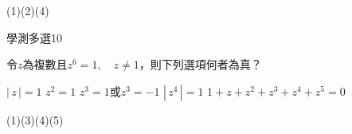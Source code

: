 \begin{QUESTIONS}
\begin{QUESTION}
        \begin{QTAGS}\end{QTAGS}
        \begin{QANS}
            (1)(2)(4)
        \end{QANS}
        \begin{QSOLLIST}
        \end{QSOLLIST}
        \begin{QEMPTYSPACE}
        \end{QEMPTYSPACE}
    \end{QUESTION}
    \begin{QUESTION}
        \begin{ExamInfo}{90}{學測}{多選}{10}
        \end{ExamInfo}
        \begin{ExamAnsRateInfo}{}{}{}{}
        \end{ExamAnsRateInfo}
        \begin{QBODY}
		令$z$為複數且${{z}^{6}}=1,\quad z\ne 1$，則下列選項何者為真？
			\begin{QOPS}
				\QOP $\left| \,z\, \right|=1$
				\QOP ${{z}^{2}}=1$
				\QOP ${{z}^{3}}=1$或${{z}^{3}}=-1$
				\QOP $\left| \,{{z}^{4}}\, \right|=1$
				\QOP $1+z+{{z}^{2}}+{{z}^{3}}+{{z}^{4}}+{{z}^{5}}=0$
			\end{QOPS}
        \end{QBODY}
        \begin{QFROMS}
        \end{QFROMS}
        \begin{QTAGS}\end{QTAGS}
        \begin{QANS}
            (1)(3)(4)(5)
        \end{QANS}
        \begin{QSOLLIST}
        \end{QSOLLIST}
        \begin{QEMPTYSPACE}
        \end{QEMPTYSPACE}
    \end{QUESTION}
\end{QUESTIONS}
